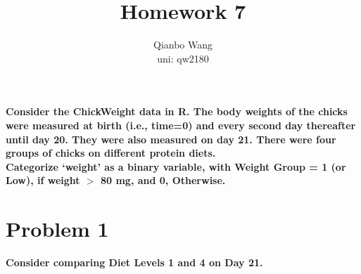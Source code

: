 \documentclass[10pt,letterpaper]{article}
\title{\textbf {Homework 7}}
\author{{Qianbo Wang}\\{uni: qw2180}}
\date{}
\begin{document}
\maketitle
\thispagestyle{fancy}
\vspace{-2em}

\textbf{Consider the ChickWeight data in R. The body weights of the chicks were measured at birth (i.e., time=0) and every second day thereafter until day 20. They were also measured on day 21. There were four groups of chicks on different protein diets.}\\

\textbf{Categorize ‘weight’ as a binary variable, with Weight Group = 1 (or Low), if weight $>$ 80 mg, and 0, Otherwise.}

\section*{Problem 1}
\textbf{Consider comparing Diet Levels 1 and 4 on Day 21.}
\end{document}
